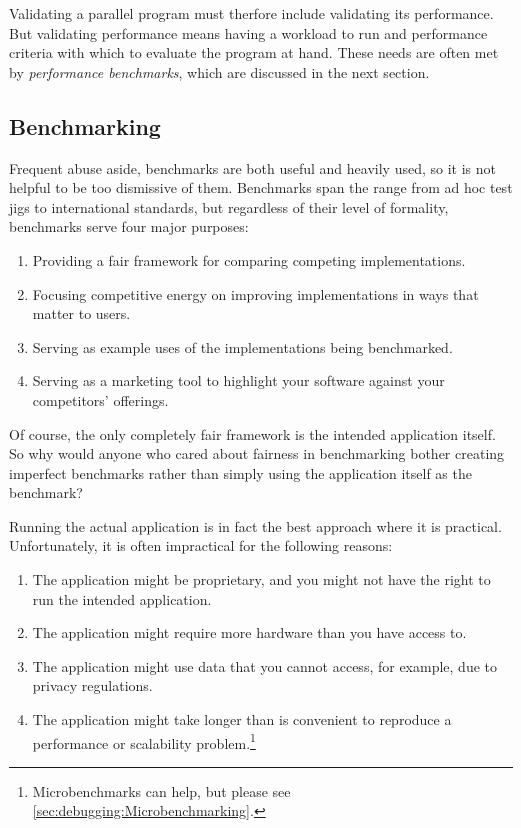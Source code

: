 Validating a parallel program must therfore include validating its
performance.
But validating performance means having a workload to run and performance
criteria with which to evaluate the program at hand.
These needs are often met by \emph{performance benchmarks}, which
are discussed in the next section.

\subsection{Benchmarking}
\label{sec:debugging:Benchmarking}

Frequent abuse aside, benchmarks are both useful and heavily used,
so it is not helpful to be too dismissive of them.
Benchmarks span the range from ad hoc test jigs to international
standards, but regardless of their level of formality, benchmarks
serve four major purposes:

\begin{enumerate}
\item	Providing a fair framework for comparing competing implementations.
\item	Focusing competitive energy on improving implementations in ways
	that matter to users.
\item	Serving as example uses of the implementations being benchmarked.
\item	Serving as a marketing tool to highlight your software
	against your competitors' offerings.
\end{enumerate}

Of course, the only completely fair framework is the intended
application itself.
So why would anyone who cared about fairness in benchmarking
bother creating imperfect benchmarks rather than simply
using the application itself as the benchmark?

Running the actual application is in fact the best approach where it is practical.
Unfortunately, it is often impractical for the following reasons:

\begin{enumerate}
\item	The application might be proprietary, and you
	might not have the right to run the intended application.
\item	The application might require more hardware
	than you have access to.
\item	The application might use data that you cannot
	access, for example, due to privacy regulations.
\item	The application might take longer than is convenient to
	reproduce a performance or scalability problem.\footnote{
		Microbenchmarks can help, but
		please see \cref{sec:debugging:Microbenchmarking}.}
\end{enumerate}


